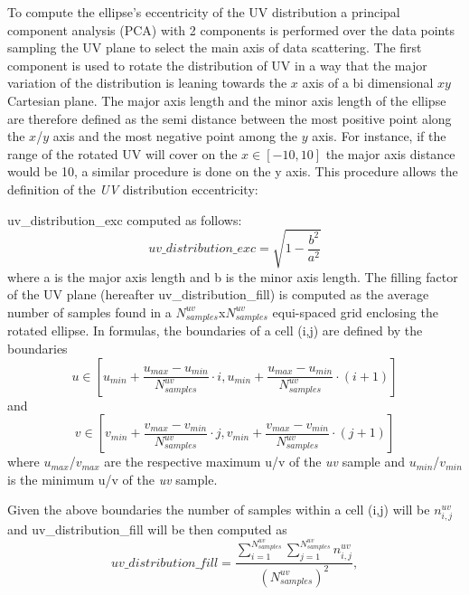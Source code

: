 \documentclass[11pt,a4paper]{ivoa}
\begin{document}
To compute the ellipse's eccentricity of the UV distribution a principal component analysis 
(PCA) with 2 components is performed over the data points sampling the UV plane to select the 
main axis of data scattering. 
The first component is used to rotate the distribution of UV in a way that the major variation 
of the distribution is leaning towards the $x$ axis of a bi dimensional $xy$ Cartesian plane. 
The major axis length and the minor axis length of the ellipse are therefore defined as the 
semi distance between the most positive point along the $x$/$y$ axis and the most negative point 
among the $y$ axis. For instance, if the range of the rotated UV will cover on the $x \in [-10, 
10]$ the major axis distance would be 10, a similar procedure is done on the y axis. This 
procedure allows the definition of the \emph{UV} distribution eccentricity:

uv\_distribution\_exc computed as follows:
\begin{equation}
uv\_distribution\_exc = \sqrt{1-\frac{b^2}{a^2}}
\end{equation}
where a is the major axis length and b is the minor axis length.
The filling factor of the UV plane (hereafter uv\_distribution\_fill) is computed as the average 
number of samples found in a $N^{uv}_{samples}$x$N^{uv}_{samples}$ equi-spaced grid enclosing the 
rotated ellipse. In formulas, the boundaries of a cell (i,j) are defined by the boundaries
\begin{equation}
u \in [u_{min} + \frac{u_{max} - u_{min}}{N^{uv}_{samples}} \cdot i , u_{min} + \frac{u_{max} - 
u_{min}}{N^{uv}_{samples}} \cdot (i + 1)]
\end{equation} 
and
\begin{equation}
v \in [v_{min} + \frac{v_{max} - v_{min}}{N^{uv}_{samples}} \cdot j , v_{min} + \frac{v_{max} - 
v_{min}}{N^{uv}_{samples}} \cdot (j + 1)]
\end{equation} 
where $u_{max}$/$v_{max}$ are the respective maximum u/v of the \emph{uv} sample and 
$u_{min}$/$v_{min}$ is the minimum u/v of the \emph{uv} sample.

Given the above boundaries the number of samples within a cell (i,j) will be $n^{uv}_{i,j}$ 
and uv\_distribution\_fill will be then computed as 
\begin{equation}
uv\_distribution\_fill = \frac{\sum^{N^{uv}_{samples}}_{i=1} \sum^{N^{uv}_{samples}}_{j=1} 
n^{uv}_{i,j} }{(N^{uv}_{samples}) ^ 2},
\end{equation}
\end{document}
